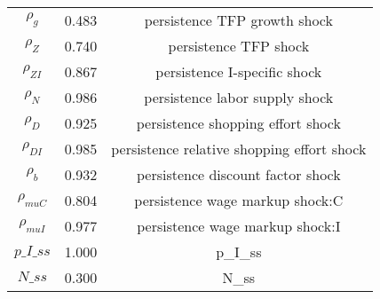 \begin{center}
\begin{longtable}{ccc}
${\rho_g}$ 	 & 	 0.483 	 & 	 persistence TFP growth shock\\
${\rho_Z}$ 	 & 	 0.740 	 & 	 persistence TFP shock\\
${\rho_{ZI}}$ 	 & 	 0.867 	 & 	 persistence I-specific shock\\
${\rho_N}$ 	 & 	 0.986 	 & 	 persistence labor supply shock\\
${\rho_D}$ 	 & 	 0.925 	 & 	 persistence shopping effort shock\\
${\rho_{DI}}$ 	 & 	 0.985 	 & 	 persistence relative shopping effort shock\\
${\rho_b}$ 	 & 	 0.932 	 & 	 persistence discount factor shock\\
${\rho_{muC}}$ 	 & 	 0.804 	 & 	 persistence wage markup shock:C\\
${\rho_{muI}}$ 	 & 	 0.977 	 & 	 persistence wage markup shock:I\\
$p\_I\_ss$ 	 & 	 1.000 	 & 	 p\_I\_ss\\
$N\_ss$ 	 & 	 0.300 	 & 	 N\_ss\\
\bottomrule%
\end{longtable}
\end{center}
